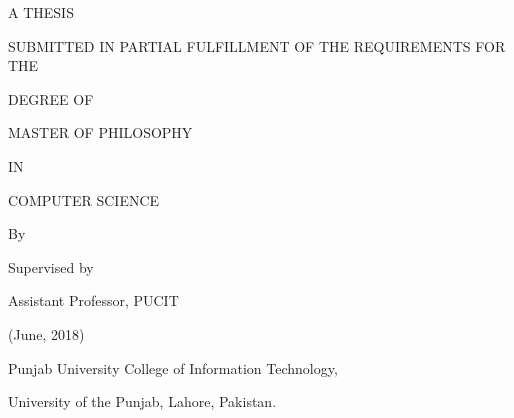 \newpage
\begin{center}
\Large{\textbf{}}



A THESIS

SUBMITTED IN PARTIAL FULFILLMENT OF THE REQUIREMENTS FOR THE 

DEGREE OF

MASTER OF PHILOSOPHY

IN

COMPUTER SCIENCE

\bigskip

    By
    
\large{\textbf{}}

\large{}

\bigskip
Supervised by

\large{\textbf{}}

Assistant Professor, PUCIT




\bigskip
(June, 2018)

\bigskip
Punjab University College of Information Technology,

\bigskip
University of the Punjab, Lahore, Pakistan. 

\end{center}
\bigskip




 








%






